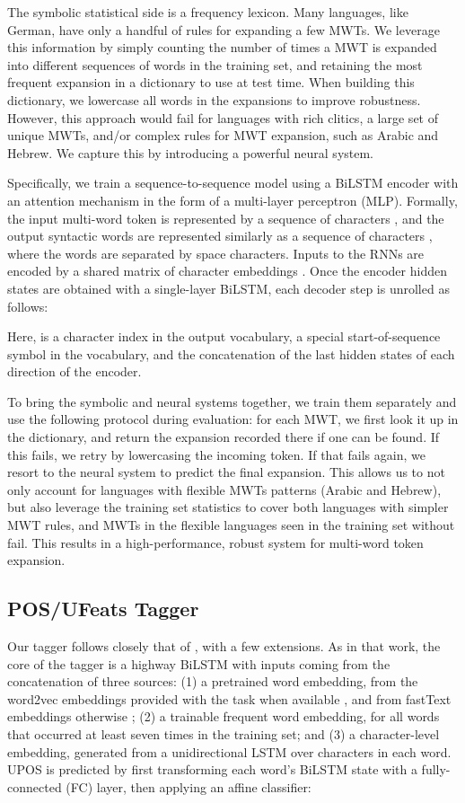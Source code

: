\documentclass[11pt,a4paper]{article}
\begin{document}
The symbolic statistical side is a frequency lexicon. Many languages, like German, have only a handful of rules for expanding a few MWTs.
We leverage this information by simply counting the number of times a MWT is expanded into different sequences of words in the training set, and retaining the most frequent expansion in a dictionary to use at test time.
When building this dictionary, we lowercase all words in the expansions to improve robustness.
However, this approach would fail for languages with rich clitics, a large set of unique MWTs, and/or complex rules for MWT expansion, such as Arabic and Hebrew. We capture this by introducing a powerful neural system.

Specifically, we train a sequence-to-sequence model using a BiLSTM encoder with an attention mechanism \cite{bahdanau2014neural} in the form of a multi-layer perceptron (MLP).
Formally, the input multi-word token is represented by a sequence of characters , and the output syntactic words are represented similarly as a sequence of characters , where the words are separated by space characters.
Inputs to the RNNs are encoded by a shared matrix of character embeddings .
Once the encoder hidden states  are obtained with a single-layer BiLSTM, each decoder step is unrolled as follows:

Here,  is a character index in the output vocabulary,  a special start-of-sequence symbol in the vocabulary, and  the concatenation of the last hidden states of each direction of the encoder.

To bring the symbolic and neural systems together, we train them separately and use the following protocol during evaluation:
for each MWT, we first look it up in the dictionary, and return the expansion recorded there if one can be found.
If this fails, we retry by lowercasing the incoming token.
If that fails again, we resort to the neural system to predict the final expansion.
This allows us to not only account for languages with flexible MWTs patterns (Arabic and Hebrew), but also leverage the training set statistics to cover both languages with simpler MWT rules, and MWTs in the flexible languages seen in the training set without fail.
This results in a high-performance, robust system for multi-word token expansion.

\subsection{POS/UFeats Tagger}
Our tagger follows closely that of \cite{dozat-qi-manning:2017:K17-3}, with a few extensions. As in that work, the core of the tagger is a highway BiLSTM \cite{srivastava2015highway} with inputs coming from the concatenation of three sources: (1) a pretrained word embedding, from the word2vec embeddings provided with the task when available \citep{mikolov2013distributed}, and from fastText embeddings otherwise \citep{bojanowski2016enriching}; (2) a trainable frequent word embedding, for all words that occurred at least seven times in the training set; and (3) a character-level embedding, generated from a unidirectional LSTM over characters in each word. UPOS is predicted by first transforming each word's BiLSTM state with a fully-connected (FC) layer, then applying an affine classifier:
\end{document}

